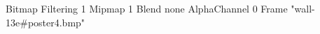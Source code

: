 {Bitmap
	{Filtering 1}
	{Mipmap 1}
	{Blend none}
	{AlphaChannel 0}
	{Frame "wall-13e#poster4.bmp"}
}
